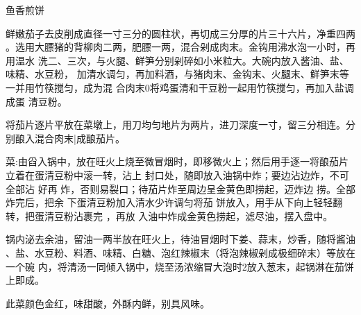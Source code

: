\begin{recipe}{鱼香煎饼}

\ingredients


\preparation

\step 鲜嫩茄子去皮削成直径一寸三分的圆柱状，再切成三分厚的片三十六片，净重四两
。选用大膘猪的背柳肉二两，肥膘一两，混合剁成肉末。金钩用沸水泡一小时，再用温水
洗二、三次，与火腿、鲜笋分别剁碎如小米粒大。大碗内放入酱油、盐、味精、水豆粉，
加清水调匀，再加料酒，与猪肉末、金钩末、火腿末、鲜笋末等一并用竹筷搅匀，成为混
合肉末0将鸡蛋清和干豆粉一起用竹筷搅匀，再加入盐调成蛋 清豆粉。

\step 将茄片逐片平放在菜墩上，用刀均匀地片为两片，进刀深度一寸，留三分相连。分
别酿入混合肉末|成酿茄片。

\step 菜:由舀入锅中，放在旺火上烧至微冒烟时，即移微火上；然后用手逐一将酿茄片
立着在蛋清豆粉中滚一转，沾上 封口处，随即放入油锅中炸；要边沾边炸，不可全部沾
好再 炸，否则易裂口；待茄片炸至周边呈金黄色即捞起，迈炸边 捞。全部炸完后，把余
下蛋清豆粉加入清水少许调匀将茄 饼放入，用手从下向上轻轻翻转，把蛋清豆粉沾裹完
，再放 入油中炸成金黄色捞起，滤尽油，摆入盘中。

\step 锅内泌去余油，留油一两半放在旺火上，待油冒烟时下姜、蒜末，炒香，随将酱油
、盐、水豆粉、料酒、味精、白糖、泡红辣椒末（将泡辣椒剁成极细碎末）等放在一个碗
内，将清汤一同倾入锅中，烧至汤浓缩冒大泡时2放入葱末，起锅淋在茄饼上即成。

\features

此菜颜色金红，味甜酸，外酥内鲜，别具风味。

\end{recipe}

